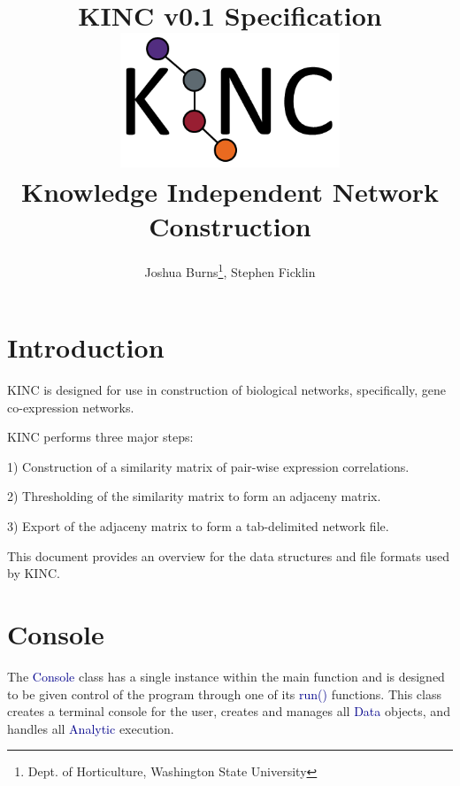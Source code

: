 \documentclass[10pt]{article}
\providecommand{\h}[1]{\textcolor{darkblue}{#1}}
\begin{document}
\title{\textbf{KINC v0.1 Specification}\\
\vspace{1mm}
\includegraphics[width=8cm,height=4cm]{KINClogo.png}
\\Knowledge Independent Network Construction}
\author{Joshua Burns\thanks{Dept. of Horticulture, Washington State 
University}, Stephen Ficklin\footnotemark[1]}
\maketitle

\newpage
\tableofcontents

\newpage
\section{Introduction}

KINC is designed for use in construction of biological networks, specifically, 
gene co-expression networks.

KINC performs three major steps:

\begin{list}{}{}
\item[1)] Construction of a similarity matrix of pair-wise expression 
correlations.
\item[2)] Thresholding of the similarity matrix to form an adjaceny matrix.
\item[3)] Export of the adjaceny matrix to form a tab-delimited network file.
\end{list}

This document provides an overview for the data structures and file formats 
used 
by KINC. 

\newpage
\section{Console}

The \h{Console} class has a single instance within the main function and is 
designed to be given control of the program through one of its \h{run()} 
functions. This class creates a terminal console for the user, creates and 
manages all \h{Data} objects, and handles all \h{Analytic} execution.
\end{document}
